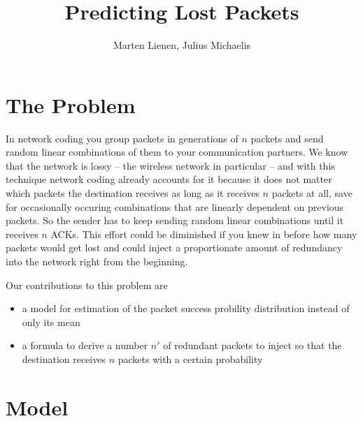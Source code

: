 \documentclass[10pt,a4paper]{article}
\title{Predicting Lost Packets}
\author{Marten Lienen, Julius Michaelis}
\begin{document}
\maketitle

\section{The Problem}

In network coding you group packets in generations of $n$ packets and send random linear combinations of them to your communication partners.
We know that the network is lossy -- the wireless network in particular -- and with this technique network coding already accounts for it because it does not matter which packets the destination receives as long as it receives $n$ packets at all, save for occasionally occuring combinations that are linearly dependent on previous packets.
So the sender has to keep sending random linear combinations until it receives $n$ ACKs.
This effort could be diminished if you knew in before how many packets would get lost and could inject a proportionate amount of redundancy into the network right from the beginning.

Our contributions to this problem are
\begin{itemize}
\item a model for estimation of the packet success probility distribution instead of only its mean
\item a formula to derive a number $n'$ of redundant packets to inject so that the destination receives $n$ packets with a certain probability
\end{itemize}

\section{Model}\label{sec:model}
\end{document}
